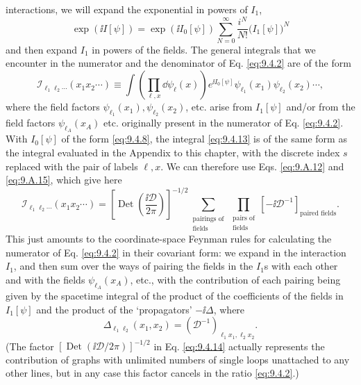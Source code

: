 interactions, we will expand the exponential in powers of $I_1$,
\begin{equation}
\exp(\ii I[\psi])=\exp(\ii I_0[\psi])
 \sum_{N=0}^{\infty}\frac{i^N}{N!}\bigl(I_1[\psi]\bigr)^N
\tag{9.4.12}\label{eq:9.4.12}
\end{equation}
and then expand $I_1$ in powers of the fields. The general integrals that we
encounter in the numerator and the denominator of Eq. \eqref{eq:9.4.2} are of the form
\begin{equation}
\mathcal I_{\ell_1\ell_2\cdots}(x_1x_2\cdots)
\equiv\int\left(\prod_{\ell,x}\dd\psi_\ell(x)\right)e^{\ii I_0[\psi]}
 \psi_{\ell_1}(x_1)\psi_{\ell_2}(x_2)\cdots,
\tag{9.4.13}\label{eq:9.4.13}
\end{equation}
where the field factors $\psi_{\ell_1}(x_1),\psi_{\ell_2}(x_2)$, etc. arise
from $I_1[\psi]$ and/or from the field factors $\psi_{\ell_A}(x_A)$ etc.
originally present in the numerator of Eq. \eqref{eq:9.4.2}. With $I_0[\psi]$ of the
form \eqref{eq:9.4.8}, the integral \eqref{eq:9.4.13} is of the same form as the integral
evaluated in the Appendix to this chapter, with the discrete index $s$
replaced with the pair of labels $\ell,x$. We can therefore use Eqs. \eqref{eq:9.A.12}
and \eqref{eq:9.A.15}, which give here
\begin{equation}
\mathcal I_{\ell_1\ell_2\cdots}(x_1x_2\cdots)
=\left[\operatorname{Det}\left(\frac{\ii\mathcal D}{2\pi}\right)\right]^{-1/2}
 \sum_{\substack{\text{pairings of}\\\text{fields}}}
 \prod_{\substack{\text{pairs of}\\\text{fields}}}
 [-\ii\mathcal D^{-1}]_{\text{paired fields}}.
\tag{9.4.14}\label{eq:9.4.14}
\end{equation}
This just amounts to the coordinate-space Feynman rules for calculating the
numerator of Eq. \eqref{eq:9.4.2} in their covariant form: we expand in the interaction
$I_1$, and then sum over the ways of pairing the fields in the $I_1$s with each
other and with the fields $\psi_{\ell_A}(x_A)$, etc., with the contribution of
each pairing being given by the spacetime integral of the product of the
coefficients of the fields in $I_1[\psi]$ and the product of the `propagators'
$-\ii\Delta$, where
\begin{equation}
\Delta_{\ell_1\ell_2}(x_1,x_2)
=(\mathcal D^{-1})_{\ell_1x_1,\ell_2x_2}.
\tag{9.4.15}\label{eq:9.4.15}
\end{equation}
(The factor $[\operatorname{Det}(\ii\mathcal D/2\pi)]^{-1/2}$ in Eq. \eqref{eq:9.4.14}
actually represents the contribution of graphs with unlimited numbers of
single loops unattached to any other lines, but in any case this factor
cancels in the ratio \eqref{eq:9.4.2}.)

